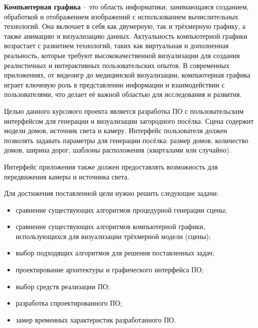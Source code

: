 
\textbf{Компьютерная графика} -- это область информатики, занимающаяся созданием, обработкой и отображением изображений с использованием вычислительных технологий. Она включает в себя как двумерную, так и трёхмерную графику, а также анимацию и визуализацию данных. Актуальность компьютерной графики возрастает с развитием технологий, таких как виртуальная и дополненная реальность, которые требуют высококачественной визуализации для создания реалистичных и интерактивных пользовательских опытов. В современных приложениях, от видеоигр до медицинской визуализации, компьютерная графика играет ключевую роль в представлении информации и взаимодействии с пользователями, что делает её важной областью для исследования и развития.

Целью данного курсового проекта является разработка ПО с пользовательским интерфейсом для генерации и визуализации загородного посёлка. Сцена содержит модели домов, источник света и камеру. Интерфейс пользователя должен позволять задавать параметры для генерации посёлка: размер домов, количество домов, ширина дорог, шаблоны расположения (кварталами или случайно). 

Интерфейс приложения также должен предоставлять возможность для передвижения камеры и источника света.

Для достижения поставленной цели нужно решить следующие задачи:
\begin{itemize}
  \item сравнение существующих алгоритмов процедурной генерации сцены;
  \item сравнение существующих алгоритмов компьютерной графики, использующихся для визуализации трёхмерной модели (сцены);
  \item выбор подходящих алгоритмов для решения поставленных задач;
  \item проектирование архитектуры и графического интерфейса ПО;
  \item выбор средств реализации ПО;
  \item разработка спроектированного ПО;
  \item замер временных характеристик разработанного ПО.
\end{itemize}
\clearpage